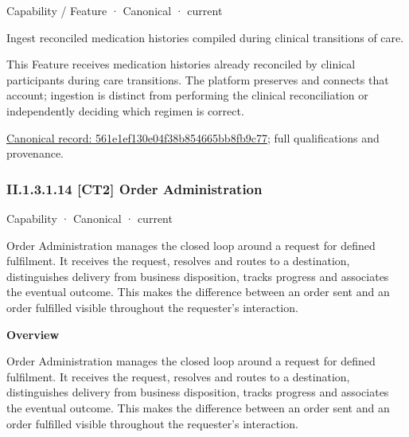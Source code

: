 \label{element:561e1ef130e04f38b854665bb8fb9c77}
{\small Capability / Feature · Canonical · current}\par

Ingest reconciled medication histories compiled during clinical transitions of care.



This Feature receives medication histories already reconciled by clinical participants during care transitions. The platform preserves and connects that account; ingestion is distinct from performing the clinical reconciliation or independently deciding which regimen is correct.


{\footnotesize \href{../../../../continuum/strategy/capability/feature/561e1ef130e04f38b854665bb8fb9c77.md}{Canonical record: 561e1ef130e04f38b854665bb8fb9c77}; full qualifications and provenance.}\par
\subsubsection*{II.1.3.1.14 [CT2] Order Administration}
\label{navigation:II.1.3.1.14}

\label{element:c3c5abd7987f4433a46cbfed8167914c}
{\small Capability · Canonical · current}\par

Order Administration manages the closed loop around a request for defined fulfilment. It receives the request, resolves and routes to a destination, distinguishes delivery from business disposition, tracks progress and associates the eventual outcome. This makes the difference between an order sent and an order fulfilled visible throughout the requester's interaction.



\textbf{Overview}



Order Administration manages the closed loop around a request for defined fulfilment. It receives the request, resolves and routes to a destination, distinguishes delivery from business disposition, tracks progress and associates the eventual outcome. This makes the difference between an order sent and an order fulfilled visible throughout the requester's interaction.



